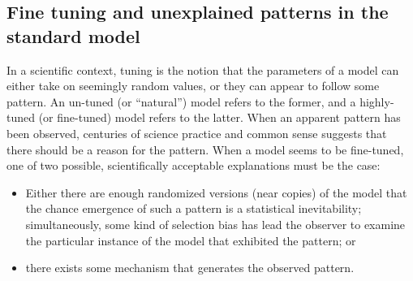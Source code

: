 \subsection{Fine tuning and unexplained patterns in the standard model}
\label{sec:finetune}
In a scientific context, tuning is the notion that the parameters of a model can either take on seemingly random values, or they can appear to follow some pattern. An un-tuned (or ``natural'') model refers to the former, and a highly-tuned (or fine-tuned) model refers to the latter. When an apparent pattern has been observed, centuries of science practice and common sense suggests that there should be a reason for the pattern. When a model seems to be fine-tuned, one of two possible, scientifically acceptable explanations must be the case:  
\begin{itemize}
\item{Either there are enough randomized versions (near copies) of the model that the chance emergence of such a pattern is a statistical inevitability; simultaneously, some kind of selection bias has lead the observer to examine the particular instance of the model that exhibited the pattern; or}
\item{there exists some mechanism that generates the observed pattern. }
\end{itemize}

